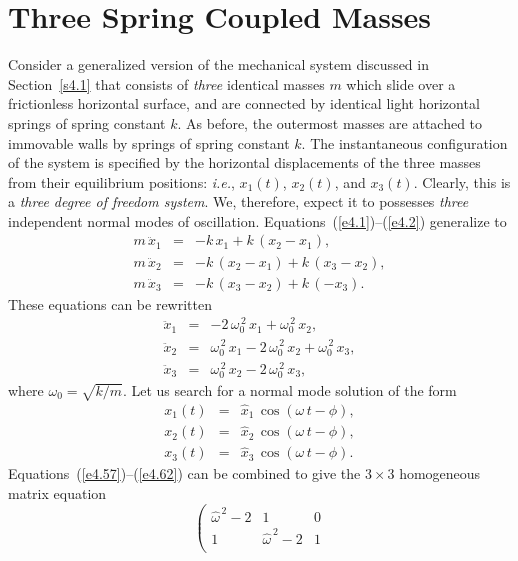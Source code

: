 {\section{Three Spring Coupled Masses}
Consider a generalized version of the mechanical system discussed in Section~\ref{s4.1}
that consists of {\em three}\/ identical masses $m$ which slide over a
frictionless horizontal surface, and are  connected by identical
light horizontal springs of spring constant $k$. As before, the outermost masses are  attached to immovable
walls by springs of spring constant $k$. The instantaneous configuration of
the system is specified by the horizontal displacements of the
three masses from their equilibrium positions: {\em i.e.},  $x_1(t)$, $x_2(t)$, and $x_3(t)$.
Clearly, this is  a {\em three degree of freedom system}. We, therefore, 
expect it to possesses
{\em three}\/ independent normal modes of oscillation. Equations~(\ref{e4.1})--(\ref{e4.2})
generalize to
\begin{eqnarray}\label{e4.54}
m\,\ddot{x}_1&=&-k\,x_1 + k\,(x_2-x_1),\\[0.5ex]
m\,\ddot{x}_2&=&-k\,(x_2-x_1)+k\,(x_3-x_2),\\[0.5ex]
m\,\ddot{x}_3&=&-k\,(x_3-x_2)+k\,(-x_3).\label{e4.56}
\end{eqnarray}
These equations can be rewritten
\begin{eqnarray}\label{e4.57}
\ddot{x}_1&=&-2\,\omega_0^{\,2}\,x_1 + \omega_0^{\,2}\,x_2,\\[0.5ex]
\ddot{x}_2&=&\omega_0^{\,2}\,x_1-2\,\omega_0^{\,2}\,x_2+\omega_0^{\,2}\,x_3,\\[0.5ex]
\ddot{x}_3 &=&\omega_0^{\,2}\,x_2-2\,\omega_0^{\,2}\,x_3,\label{e4.60}
\end{eqnarray}
where $\omega_0=\sqrt{k/m}$.
Let us search for a normal mode  solution of the form
\begin{eqnarray}
x_1(t)&=&\hat{x}_1\,\cos(\omega\,t-\phi),\\[0.5ex]
x_2(t)&=&\hat{x}_2\,\cos(\omega\,t-\phi),\\[0.5ex]
x_3(t)&=&\hat{x}_3\,\cos(\omega\,t-\phi).\label{e4.62}
\end{eqnarray}
Equations~(\ref{e4.57})--(\ref{e4.62}) can be combined to give  the $3\times 3$ homogeneous matrix equation
\begin{equation}
\left(\begin{array}{ccc}
\hat{\omega}^{\,2}-2 & 1 & 0\\[0.5ex]
1 & \hat{\omega}^{\,2}-2 & 1\\[0.5ex]

\end{array}
\end{equation}}
